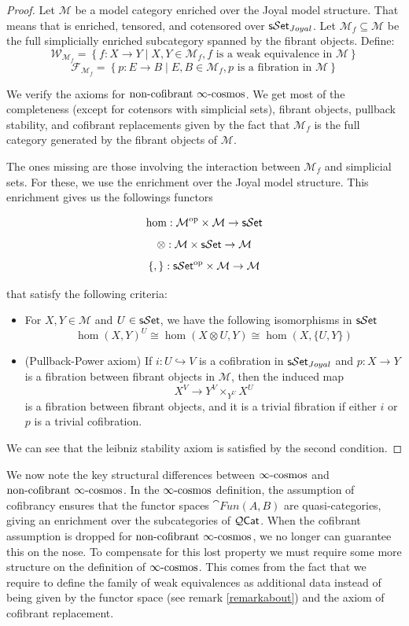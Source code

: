 \begin{proof}
    Let $\mathcal{M}$ be a model category enriched over the Joyal model structure. That means that is enriched, tensored, and cotensored over $\textup{\textsf{s}}\mathcal{S}\textup{\textsf{et}}_{Joyal}$. Let $\mathcal{M}_f\subseteq \mathcal{M}$ be the full simplicially enriched subcategory spanned by the fibrant objects.
    Define:
    \[\mathcal{W}_{\mathcal{M}_f}=\left\{f:X\rightarrow Y \mid X,Y \in \mathcal{M}_f, f \text{ is a weak equivalence in }\mathcal{M}\right\}\]
    \[\mathcal{F}_{\mathcal{M}_f}=\left\{p:E\rightarrow B \mid E,B \in \mathcal{M}_f, p \text{ is a fibration in }\mathcal{M}\right\}\]
    
    We verify the axioms for $\text{non-cofibrant }\infty\text{-cosmos}$. We get most of the completeness (except for cotensors with simplicial sets), fibrant objects, pullback stability, and cofibrant replacements given by the fact that $\mathcal{M}_f$ is the full category generated by the fibrant objects of $\mathcal{M}$. 
   
   The ones missing are those involving the interaction between $\mathcal{M}_f$ and simplicial sets. For these, we use the enrichment over the Joyal model structure. This enrichment gives us the followings functors

   \[\hom:\mathcal{M}^{\textup{op}}\times \mathcal{M}\rightarrow\textup{\textsf{s}}\mathcal{S}\textup{\textsf{et}} \]
   \[\otimes:\mathcal{M}\times \textup{\textsf{s}}\mathcal{S}\textup{\textsf{et}} \rightarrow \mathcal{M}\]
   \[\{,\}:\textup{\textsf{s}}\mathcal{S}\textup{\textsf{et}}^{\textup{op}}\times \mathcal{M} \rightarrow \mathcal{M}\]
   
   that satisfy the following criteria:
   \begin{itemize}
    \item For $X,Y \in \mathcal{M}$ and $U \in \textup{\textsf{s}}\mathcal{S}\textup{\textsf{et}}$, we have the following isomorphisms in $\textup{\textsf{s}}\mathcal{S}\textup{\textsf{et}}$ \[\hom(X,Y)^U\cong\hom(X\otimes U,Y)\cong \hom(X,\{U,Y\})\]
    \item (Pullback-Power axiom) If $i:U\hookrightarrow V$ is a cofibration in $\textup{\textsf{s}}\mathcal{S}\textup{\textsf{et}}_{Joyal}$ and $p:X\to Y$ is a fibration between fibrant objects in $\mathcal{M}$, then the induced map
   \[
        X^V \to Y^V \times_{Y^U} X^U
   \]
   is a fibration between fibrant objects, and it is a trivial fibration if either $i$ or $p$ is a trivial cofibration.
   \end{itemize}
    We can see that the leibniz stability axiom is satisfied by the second condition. 
\end{proof}

\begin{rmk}
We now note the key structural differences between $\infty\text{-cosmos}$ and $\text{non-cofibrant }\infty\text{-cosmos}$. In the $\infty\text{-cosmos}$ definition, the assumption of cofibrancy ensures that the functor spaces $\cat{Fun(A,B)}$ are quasi-categories, giving an enrichment over the subcategories of $\mathcal{Q}\textup{\textsf{Cat}}$. When the cofibrant assumption is dropped for $\text{non-cofibrant }\infty\text{-cosmos}$, we no longer can guarantee this on the nose. To compensate for this lost property we must require some more structure on the definition of $\infty\text{-cosmos}$. This comes from the fact that we require to define the family of weak equivalences as additional data instead of being given by the functor space (see remark \ref{remarkabout}) and the axiom of cofibrant replacement.
\end{rmk}

